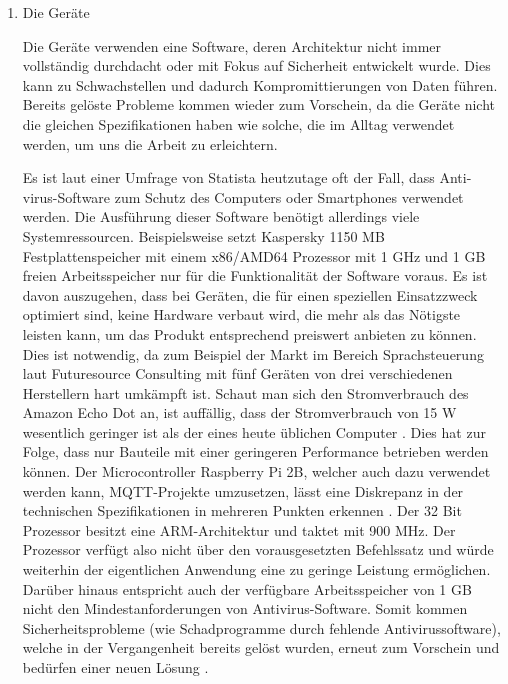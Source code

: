         \begin{enumerate}
            \item Die Geräte
            
            Die Geräte verwenden eine Software, deren Architektur nicht immer vollständig durchdacht oder mit Fokus auf Sicherheit entwickelt wurde. Dies kann zu Schwachstellen und dadurch Kompromittierungen von Daten führen. Bereits gelöste Probleme kommen wieder zum Vorschein, da die Geräte nicht die gleichen Spezifikationen haben wie solche, die im Alltag verwendet werden, um uns die Arbeit zu erleichtern. 
        
            Es ist laut einer Umfrage von Statista \cite{kaspersky_lab_2019}
            heutzutage oft der Fall, dass Anti-virus-Software zum Schutz des Computers oder Smartphones verwendet werden. Die Ausführung dieser Software benötigt allerdings viele Systemressourcen.
            Beispielsweise setzt Kaspersky \cite{ao_kaspersky_lab_2018_1}
            1150 MB Festplattenspeicher mit einem x86/AMD64 Prozessor mit 1 GHz und 1 GB freien Arbeitsspeicher nur für die Funktionalität der Software voraus. Es ist davon auszugehen, dass bei Geräten, die für einen speziellen Einsatzzweck optimiert sind, keine Hardware verbaut wird, die mehr als das Nötigste leisten kann, um das Produkt entsprechend preiswert anbieten zu können. Dies ist notwendig, da zum Beispiel der Markt im Bereich Sprachsteuerung laut Futuresource Consulting \cite{futuresource_consulting_ltd_2019} mit fünf Geräten von drei verschiedenen Herstellern hart umkämpft ist. Schaut man sich den Stromverbrauch des Amazon Echo Dot an, ist auffällig, dass der Stromverbrauch von 15 W wesentlich geringer ist als der eines heute üblichen Computer \cite{amazon_de_alle_produkte_2018}. Dies hat zur Folge, dass nur Bauteile mit einer geringeren Performance betrieben werden können.
            Der Microcontroller Raspberry Pi 2B, welcher auch dazu verwendet werden kann, \ac{MQTT}-Projekte umzusetzen, lässt eine Diskrepanz in der technischen Spezifikationen in mehreren Punkten erkennen \cite{raspberry_pi_foundation_2016}. Der 32 Bit Prozessor besitzt eine \ac{ARM}-Architektur und taktet mit 900 MHz. Der Prozessor verfügt also nicht über den vorausgesetzten Befehlssatz und würde weiterhin der eigentlichen Anwendung eine zu geringe Leistung ermöglichen. Darüber hinaus entspricht auch der verfügbare Arbeitsspeicher von 1 GB nicht den Mindestanforderungen von Antivirus-Software.
            Somit kommen Sicherheitsprobleme (wie Schadprogramme durch fehlende Antivirussoftware), welche in der Vergangenheit bereits gelöst wurden, erneut zum Vorschein und bedürfen einer neuen Lösung \cite{6978614}.
            

\end{enumerate}
